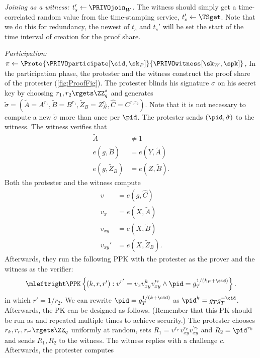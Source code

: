 \emph{Joining as a witness: \(t_s'\gets \PRIVOjoin_W\).}
The witness should simply get a time-correlated random value from the time-stamping service, \(t_s'\gets \TSget\).
Note that we do this for redundancy, the newest of \(t_s\) and \(t_s'\) will be set the start of the time interval of creation for the proof share.


\emph{Participation: \(\pi\gets
    \Proto{\PRIVOparticipate[\cid, \sk_P]}{\PRIVOwitness[\sk_W, \spk]}\),}
In the participation phase, the protester and the witness construct the proof share of the protester (\cref{fig:ProofFig}).
The protester blinds his signature \(\sigma\) on his secret key by choosing \(r_1, r_2\rgets \ZZ_q^*\) and generates \(
  \tilde\sigma = (\tilde A = A^{r_1},
                  \tilde B = B^{r_1},
                  \tilde Z_B = Z_B^{r_1},
                  \hat C = C^{r_1 r_2}).
\) 
Note that it is not necessary to compute a new \(\tilde\sigma\) more than once per \(\pid\).
The protester sends \((\pid, \tilde\sigma)\) to the witness.
The witness verifies that
\begin{align*}
  \tilde A          &\neq 1 \\
  e(g, \tilde B)    &= e(Y, \tilde A) \\
  e(g, \tilde Z_B)  &= e(Z, \tilde B).
\end{align*}
Both the protester and the witness compute
\begin{align*}
  v &= e(g, \hat C) \\
  v_x &= e(X, \tilde A) \\
  v_{xy} &= e(X, \tilde B) \\
  v_{xy}' &= e(X, \tilde Z_B).
\end{align*}
Afterwards, they run the following \ac{PPK} with the protester as the prover and the witness as the verifier:
\begin{multline*}
  \mleftright
  \PPK\left\{(k, r, r') : v^{r'} = v_x v_{xy}^k v_{xy}^{\prime r} \land
    \pid = g_T^{1/(k_P+\cid)} \right\}.
\end{multline*}
in which \(r' = 1/r_2\).
We can rewrite \(\pid = g_T^{1/(k+\cid)}\) as \(\pid^k = g_T g_T^{-\cid}\).
Afterwards, the \ac{PK} can be designed as follows.
(Remember that this \ac{PK} should be run as  and repeated multiple 
times to achieve security.)
The protester chooses \(r_k, r_r, r_{r'}\rgets \ZZ_q\) uniformly at random, 
sets \(R_1 = v^{r_{r'}} v_{xy}^{r_k} v_{xy}^{\prime r_r}\) and \(R_2 = 
  \pid^{r_k}\) and sends \(R_1, R_2\) to the witness.
The witness replies with a challenge \(c\).
Afterwards, the protester computes
